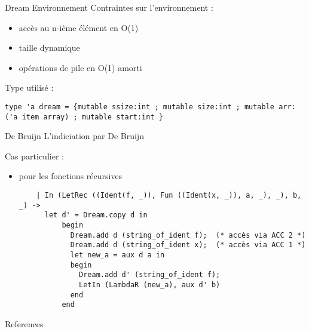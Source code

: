 \documentclass[10pt]{beamer}
\begin{document}
\begin{frame}[fragile]{Dream Environnement}
Contraintes sur l'environnement :
\begin{itemize}
\item accès au n-ième élément en O(1) 
\item taille dynamique
\item opérations de pile en O(1) amorti
\end{itemize}
Type utilisé :

\begin{verbatim}
type 'a dream = {mutable ssize:int ; mutable size:int ; mutable arr:('a item array) ; mutable start:int }
\end{verbatim}

\end{frame}

\begin{frame}[fragile]{De Bruijn}
L'indiciation par De Bruijn 

Cas particulier :
	\begin{itemize}
	\item pour les fonctions récursives 
    \begin{verbatim}
    | In (LetRec ((Ident(f, _)), Fun ((Ident(x, _)), a, _), _), b, _) ->
      let d' = Dream.copy d in
          begin
            Dream.add d (string_of_ident f);  (* accès via ACC 2 *)
            Dream.add d (string_of_ident x);  (* accès via ACC 1 *)
            let new_a = aux d a in
            begin
              Dream.add d' (string_of_ident f);
              LetIn (LambdaR (new_a), aux d' b)
            end
          end
	\end{verbatim}
    \end{itemize}
\end{frame}



\appendix

\begin{frame}[allowframebreaks]{References}
\nocite{*}
  
  
\end{frame}
\end{document}
